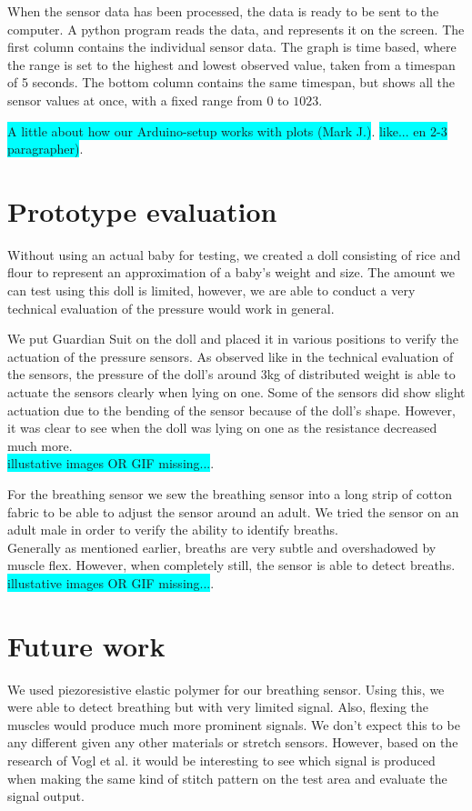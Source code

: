 \documentclass{sigchi-ext}
\begin{document}
When the sensor data has been processed, the data is ready to be sent to the computer. A python program reads the data, and represents it on the screen.
The first column contains the individual sensor data. The graph is time based, where the range is set to the highest and lowest observed value, taken from a timespan of 5 seconds.
The bottom column contains the same timespan, but shows all the sensor values at once, with a fixed range from $0$ to $1023$. 

\colorbox{cyan}{A little about how our Arduino-setup works with plots (Mark J.)}.
\colorbox{cyan}{like... en 2-3 paragrapher)}.


\section{Prototype evaluation}
Without using an actual baby for testing, we created a
doll consisting of rice and flour to represent an
approximation of a baby's weight and size. The amount we 
can test using this doll is limited, however, we are able 
to conduct a very technical evaluation of the pressure 
would work in general.

We put Guardian Suit on the doll and placed it in various
positions to verify the actuation of the pressure sensors.
As observed like in the technical evaluation of the sensors,
the pressure of the doll's around 3kg of distributed weight
is able to actuate the sensors clearly when lying on one. 
Some of the sensors did show slight actuation due to the
bending of the sensor because of the doll's shape. However,
it was clear to see when the doll was lying on one as the 
resistance decreased much more.\\
\colorbox{cyan}{illustative images OR GIF missing...}.

For the breathing sensor we sew the breathing sensor into
a long strip of cotton fabric to be able to adjust the 
sensor around an adult. We tried the sensor on an 
adult male in order to verify the ability to identify 
breaths.\\
Generally as mentioned earlier, breaths are very subtle and
overshadowed by muscle flex. However, when completely still,
the sensor is able to detect breaths.\\
\colorbox{cyan}{illustative images OR GIF missing...}.

\section{Future work}
We used piezoresistive elastic polymer for our breathing sensor. Using this,
we were able to detect breathing but with very limited signal. Also, flexing the muscles
would produce much more prominent signals. We don't expect this to be any
different given any other materials or stretch sensors. However,
based on the research of Vogl et al. \cite{stretcheband} it would be interesting
to see which signal is produced when making the same kind of stitch pattern on
the test area and evaluate the signal output.
\end{document}
